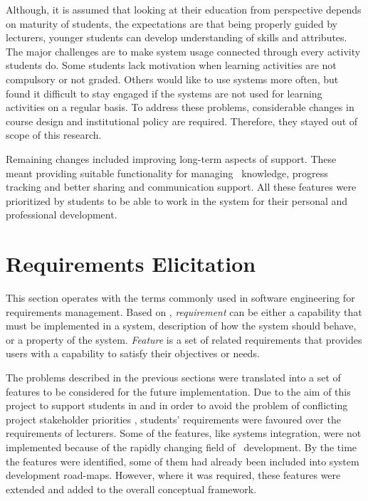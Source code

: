 Although, it is assumed that looking at their education from \LLLs
perspective depends on maturity of students, the expectations are that being
properly guided by lecturers, younger students can develop understanding of
\LLLs skills and attributes. The major challenges are to make system usage
connected through every activity students do. Some students lack motivation
when learning activities are not compulsory or not graded. Others would like to
use systems more often, but found it difficult to stay engaged if the systems
are not used for learning activities on a regular basis. To address these
problems, considerable changes in course design and institutional policy are
required. Therefore, they stayed out of scope of this research.

Remaining changes included improving long-term aspects of \LLLs support. These
meant providing suitable functionality for managing \ep~knowledge, progress
tracking and better sharing and communication support. All these features were
prioritized by students to be able to work in the system for their personal and
professional development. 

\section{Requirements Elicitation}
\label{sec:elicit}
This section operates with the terms commonly used in software engineering for
requirements management. Based on \citet{Wiegers2003}, \textit{requirement} can
be either a capability that must be implemented in a system, description of how
the system should behave, or a property of the system. \textit{Feature} is a set
of related requirements that provides users with a capability to satisfy their
objectives or needs.

The problems described in the previous sections were translated into a set of
features to be considered for the future implementation. Due to the aim of this
project to support students in \LLLs and in order to avoid the problem of
conflicting project stakeholder priorities \citep{Leffingwell2011}, students'
requirements were favoured over the requirements of lecturers. Some of the
features, like systems integration, were not implemented because of the
rapidly changing field of \ep~development. By the time the features were
identified, some of them had already been included into system development
road-maps. However, where it was required, these features were extended and
added to the overall conceptual framework.

